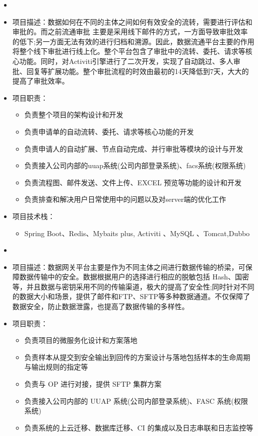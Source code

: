   \begin{itemize}[leftmargin=*]

  \item
    \item 项目描述：数据如何在不同的主体之间如何有效安全的流转，需要进行评估和审批的。而之前流通审批 主要是采用线下邮件的方式，一方面导致审批效率的低下;另一方面无法有效的进行归档和溯源。因此，数据流通平台主要的作用将整个线下审批进行线上化。整个平台包含了审批中的流转、委托、请求等核心功能。同时，对Activiti引擎进行了二次开发，实现了自动跳过、多人审批、回复等扩展功能。整个审批流程的时效由最初的14天降低到7天，大大的提高了审批效率。
  \item 项目职责：
    {\small
    \begin{itemize}
      \item 负责整个项目的架构设计和开发
      \item 负责申请单的自动流转、委托、请求等核心功能的开发
      \item 负责申请人的自动扩展、节点自动完成、并行审批等模块的设计与开发
      \item 负责接入公司内部的uuap系统(公司内部登录系统)、facs系统(权限系统)
      \item 负责流程图、邮件发送、文件上传、EXCEL 预览等功能的设计和开发
      \item 负责排查和解决用户日常使用中的问题以及对server端的优化工作
    \end{itemize}
    }
    \item 项目技术栈：
    {\small
    \begin{itemize}
      \item Spring Boot、Redis、Mybaits plus, Activiti 、MySQL 、Tomcat,Dubbo
    \end{itemize}
    }

  \item
    \item 项目描述：数据网关平台主要是作为不同主体之间进行数据传输的桥梁，可保障数据传输中的安全。数据根据用户的选择进行相应的脱敏包括 Hash、国密等，并且数据与密钥采用不同的传输渠道，极大的提高了安全性;同时针对不同的数据大小和场景，提供了邮件和FTP、SFTP等多种数据通道。不仅保障了数据安全，防止数据泄露，也提高了数据传输的多样性。
    \item 项目职责：
    {\small
    \begin{itemize}
      \item 负责项目的微服务化设计和方案落地
      \item 负责样本从提交到安全输出到回传的方案设计与落地包括样本的生命周期与输出规则的指定等
      \item 负责与 OP 进行对接，提供 SFTP 集群方案
      \item 负责接入公司内部的 UUAP 系统(公司内部登录系统)、FASC 系统(权限系统) 
      \item 负责系统的上云迁移、数据库迁移、CI 的集成以及日志串联和日志监控等
    \end{itemize}
    } 


\end{itemize}
